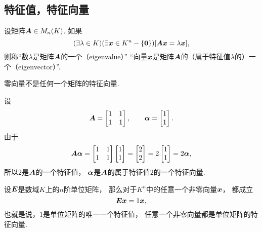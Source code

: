 \subsection{特征值，特征向量}
\begin{definition}
设矩阵\(\boldsymbol{A} \in M_n(K)\).
如果\begin{equation*}
	(\exists \lambda \in K)
	(\exists \boldsymbol{x} \in K^n - \{\boldsymbol0\})
	[\boldsymbol{A}\boldsymbol{x} = \lambda\boldsymbol{x}],
\end{equation*}
则称“数\(\lambda\)是矩阵\(\boldsymbol{A}\)的一个（eigenvalue）”
“向量\(\boldsymbol{x}\)是矩阵\(\boldsymbol{A}\)的（属于特征值\(\lambda\)的）一个（eigenvector）”.
\end{definition}
\begin{remark}
零向量不是任何一个矩阵的特征向量.
\end{remark}
\begin{example}
设\begin{equation*}
	\boldsymbol{A} = \begin{bmatrix}
		1 & 1 \\ 1 & 1
	\end{bmatrix},
	\qquad
	\boldsymbol\alpha = \begin{bmatrix}
		1 \\ 1
	\end{bmatrix}.
\end{equation*}
由于\begin{equation*}
	\boldsymbol{A} \boldsymbol\alpha
	= \begin{bmatrix}
		1 & 1 \\ 1 & 1
	\end{bmatrix}
	\begin{bmatrix}
		1 \\ 1
	\end{bmatrix}
	= \begin{bmatrix}
		2 \\ 2
	\end{bmatrix}
	= 2 \begin{bmatrix}
		1 \\ 1
	\end{bmatrix}
	= 2 \boldsymbol\alpha,
\end{equation*}
所以\(2\)是\(\boldsymbol{A}\)的一个特征值，
\(\boldsymbol\alpha\)是\(\boldsymbol{A}\)的属于特征值\(2\)的一个特征向量.
\end{example}
\begin{example}
设\(\boldsymbol{E}\)是数域\(K\)上的\(n\)阶单位矩阵，
那么对于\(K^n\)中的任意一个非零向量\(\boldsymbol{x}\)，
都成立\begin{equation*}
	\boldsymbol{E} \boldsymbol{x} = 1 \boldsymbol{x},
\end{equation*}
也就是说，\(1\)是单位矩阵的唯一一个特征值，
任意一个非零向量都是单位矩阵的特征向量.
\end{example}


